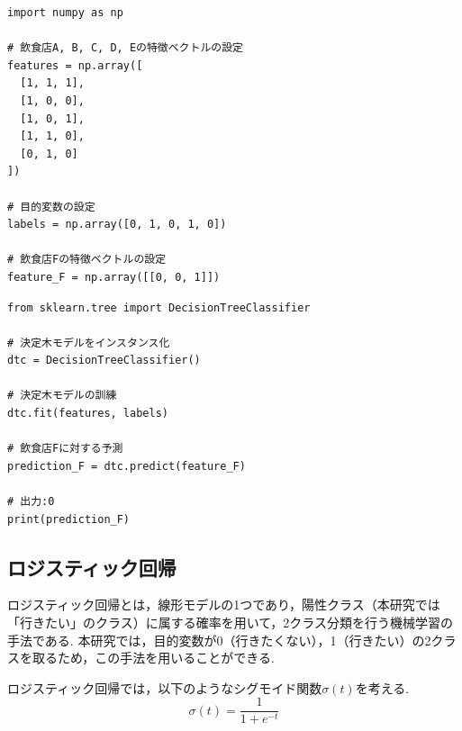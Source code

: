 \documentclass[12pt,a4j]{jreport}
\begin{document}
\begin{lstlisting}[caption=特徴ベクトルと目的変数の設定,label=入力変数と目的変数の設定]
import numpy as np

# 飲食店A, B, C, D, Eの特徴ベクトルの設定
features = np.array([
  [1, 1, 1],  
  [1, 0, 0],  
  [1, 0, 1],  
  [1, 1, 0],  
  [0, 1, 0]   
])

# 目的変数の設定
labels = np.array([0, 1, 0, 1, 0])

# 飲食店Fの特徴ベクトルの設定
feature_F = np.array([[0, 0, 1]])
\end{lstlisting}

\begin{lstlisting}[caption=決定木による予測,label=決定木]
from sklearn.tree import DecisionTreeClassifier

# 決定木モデルをインスタンス化
dtc = DecisionTreeClassifier()

# 決定木モデルの訓練
dtc.fit(features, labels)

# 飲食店Fに対する予測
prediction_F = dtc.predict(feature_F)

# 出力:0
print(prediction_F)
\end{lstlisting}

\subsection{ロジスティック回帰}
ロジスティック回帰とは，線形モデルの1つであり，陽性クラス（本研究では「行きたい」のクラス）に属する確率を用いて，2クラス分類を行う機械学習の手法である.
本研究では，目的変数が0（行きたくない），1（行きたい）の2クラスを取るため，この手法を用いることができる.

ロジスティック回帰では，以下のようなシグモイド関数\( \sigma(t) \)を考える.\\
\[
\sigma(t) = \frac{1}{1 + e^{-t}}
\]\\
\end{document}

